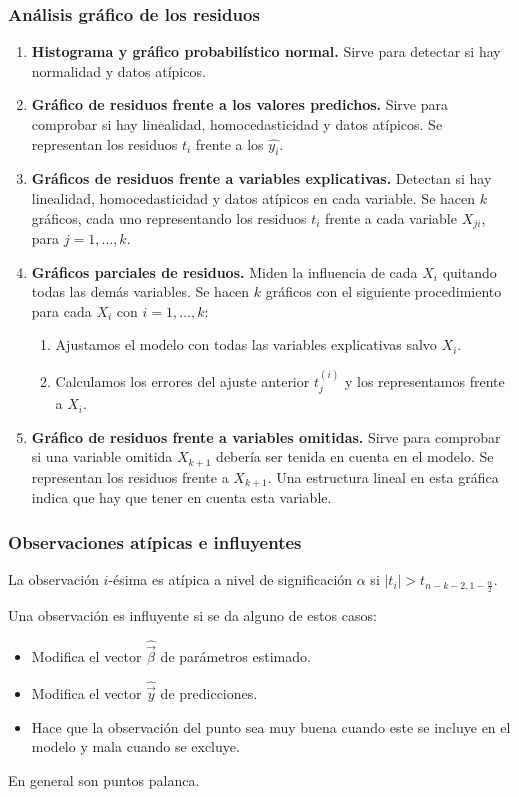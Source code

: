 \documentclass{report}
\theoremstyle{remark}
\theoremstyle{remark}
\theoremstyle{remark}
\theoremstyle{definition}
\theoremstyle{definition}
\theoremstyle{definition}
\begin{document}
\subsubsection*{Análisis gráfico de los residuos}
\begin{enumerate}
    \item \textbf{Histograma y gráfico probabilístico normal.}
          Sirve para detectar si hay normalidad y datos atípicos.
    \item \textbf{Gráfico de residuos frente a los valores predichos.}
          Sirve para comprobar si hay linealidad, homocedasticidad y datos atípicos.
          Se representan los residuos $t_i$ frente a los $\hat{y_i}$.
    \item \textbf{Gráficos de residuos frente a variables explicativas.}
          Detectan si hay linealidad, homocedasticidad y datos atípicos en cada variable.
          Se hacen $k$ gráficos, cada uno representando los residuos $t_i$ frente a cada variable $X_{ji}$, para $j = 1, \dots, k$.
    \item \textbf{Gráficos parciales de residuos.}
          Miden la influencia de cada $X_i$ quitando todas las demás variables.
          Se hacen $k$ gráficos con el siguiente procedimiento para cada $X_i$ con $i = 1, \dots, k$:
          \begin{enumerate}
              \item Ajustamos el modelo con todas las variables explicativas salvo $X_i$.
              \item Calculamos los errores del ajuste anterior $t_j^{(i)}$ y los representamos frente a $X_i$.
          \end{enumerate}
    \item \textbf{Gráfico de residuos frente a variables omitidas.}
          Sirve para comprobar si una variable omitida $X_{k+1}$ debería ser tenida en cuenta en el modelo.
          Se representan los residuos frente a $X_{k+1}$.
          Una estructura lineal en esta gráfica indica que hay que tener en cuenta esta variable.
\end{enumerate}

\subsubsection*{Observaciones atípicas e influyentes}
La observación $i$-ésima es atípica a nivel de significación $\alpha$ si $|t_i| > t_{n-k-2, 1-\frac{\alpha}{2}}$.

Una observación es influyente si se da alguno de estos casos:
\begin{itemize}
    \item Modifica el vector $\hat{\vec{\beta}}$ de parámetros estimado.
    \item Modifica el vector $\hat{\vec{y}}$ de predicciones.
    \item Hace que la observación del punto sea muy buena cuando este se incluye en el modelo y mala cuando se excluye.
\end{itemize}
En general son puntos palanca.
\end{document}
